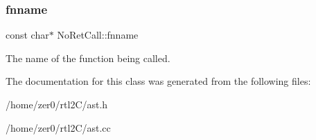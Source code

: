 \subsubsection{\texorpdfstring{fnname}{fnname}}
{\footnotesize\ttfamily const char$\ast$ No\+Ret\+Call\+::fnname\hspace{0.3cm}{\ttfamily [protected]}}

The name of the function being called. 

The documentation for this class was generated from the following files\+:\begin{DoxyCompactItemize}
\item 
/home/zer0/rtl2\+C/ast.\+h\item 
/home/zer0/rtl2\+C/ast.\+cc\end{DoxyCompactItemize}
